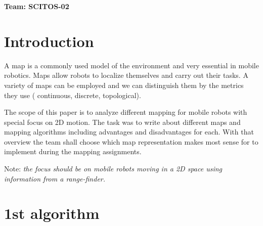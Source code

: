 \documentclass[12pt, a4paper, twocolumn]{article}
\begin{document}
\textbf{Team: SCITOS-02}

\section{Introduction}
A map is a commonly used model of the environment and very essential in mobile robotics. Maps allow robots to localize themselves and carry out their tasks. A variety of maps can be employed and we can distinguish them by the metrics they use ( continuous, discrete, topological).\par
The scope of this paper is to analyze different mapping for mobile robots with special focus on 2D motion. The task was to write about different maps and mapping algorithms including advantages and disadvantages for each. With that overview the team shall choose which map representation makes most sense for to implement during the mapping assignments. \par
Note: \emph{ the focus should be on mobile robots moving in a 2D space using information from a range-finder.}

\section{1st algorithm}
\par 
\end{document}
